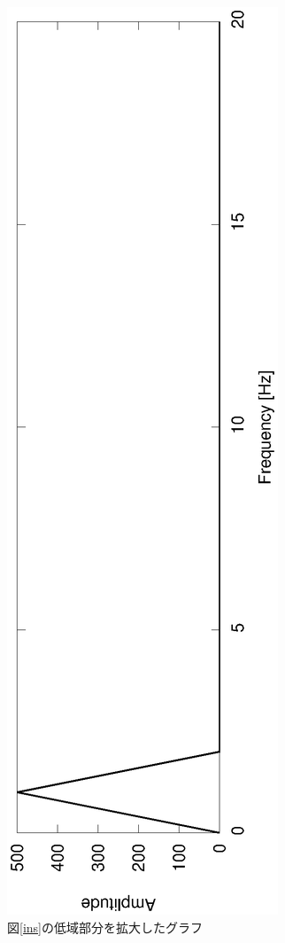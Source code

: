\documentclass[a4j]{jsarticle}
\begin{document}
\begin{figure}[H]
 \centering
 \vspace{-4cm}
 \hspace{-2cm}
 \includegraphics[angle=-90,scale=0.6]{Input_spec_kakudai.eps}
  \vspace{-2cm}
 \caption{図\ref{ins}の低域部分を拡大したグラフ}
 \label{insk}
\end{figure}
\end{document}
